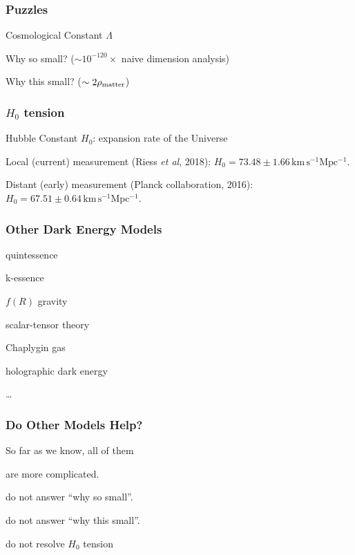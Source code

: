 \documentclass[CJK]{beamer}
\begin{document}
\begin{frame}
  \frametitle{Puzzles}

  Cosmological Constant $\Lambda$
  

  \bitem
\item{Why so small? ($\sim 10^{-120}\times$ naive dimension analysis)}
\item{Why this small? ($\sim 2 \rho_{\rm matter}$)}
  \eitem
\end{frame}


\begin{frame}
  \frametitle{$H_0$ tension}
  Hubble Constant $H_0$: expansion rate of the Universe
  \skipline

  
  Local (current)  measurement (Riess {\it et al}, 2018): $H_0 = 73.48\pm 1.66\, \mathrm {km\,s^{-1}Mpc^{-1}}$.

  \skipline
  
  Distant (early) measurement (Planck collaboration, 2016): $H_0 = 67.51\pm 0.64 \, \mathrm {km\,s^{-1}Mpc^{-1}}$.
\end{frame}

\begin{frame}
  \frametitle{Other Dark Energy Models}
  \begin{Large}
  \bitem
\item{quintessence}
\item{k-essence}
\item{$f(R)$ gravity}
\item{scalar-tensor theory}
\item{Chaplygin gas}  
\item{holographic dark energy}
\item{\ldots}
  \eitem
  \end{Large}
\end{frame}

\begin{frame}
  \frametitle{Do Other Models Help?}
  \begin{Large}
    So far as we know, all of them
    \bitem
  \item{are more complicated.}
  \item{do not answer ``why so small''.}
  \item{do not answer ``why this small''.}
  \item{do not resolve $H_0$ tension}
    \eitem
  \end{Large}
\end{frame}
\end{document}
